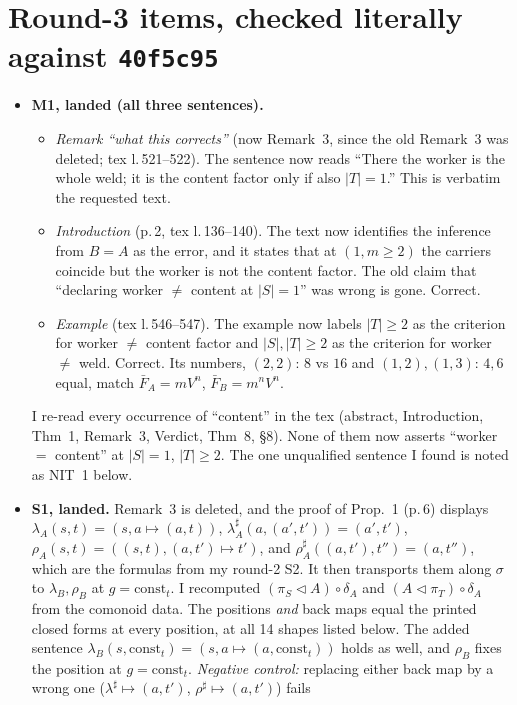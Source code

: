 \documentclass[10pt]{article}
\newcommand{\cst}{\mathrm{const}}
\begin{document}
\section*{Round-3 items, checked literally against \texttt{40f5c95}}
\begin{itemize}[leftmargin=*]
\item \textbf{M1, landed (all three sentences).}
  \begin{itemize}[leftmargin=*]
  \item \emph{Remark ``what this corrects''} (now Remark~3, since the old Remark~3 was deleted; tex l.\,521--522). The sentence now reads ``There the
  worker is the whole weld; it is the content factor only if also $|T|=1$.'' This is verbatim the requested text.
  \item \emph{Introduction} (p.\,2, tex l.\,136--140). The text now identifies the inference from $B=A$ as the error, and it states that at $(1,m\ge2)$ the carriers
  coincide but the worker is not the content factor. The old claim that ``declaring worker $\ne$ content at $|S|=1$'' was wrong is gone. Correct.
  \item \emph{Example} (tex l.\,546--547). The example now labels $|T|\ge2$ as the criterion for worker $\ne$ content factor and $|S|,|T|\ge2$ as the criterion for worker
  $\ne$ weld. Correct. Its numbers, $(2,2)$: $8$ vs $16$ and $(1,2),(1,3)$: $4,6$ equal, match $\bar F_A=mV^n$, $\bar F_B=m^nV^n$.
  \end{itemize}
  I re-read every occurrence of ``content'' in the tex (abstract, Introduction, Thm~1, Remark~3, Verdict, Thm~8, \S8). None of them now asserts
  ``worker $=$ content'' at $|S|=1$, $|T|\ge2$. The one unqualified sentence I found is noted as NIT~1 below.
\item \textbf{S1, landed.} Remark~3 is deleted, and the proof of Prop.~1 (p.\,6) displays
  $\lambda_A(s,t)=(s,a\mapsto(a,t))$, $\lambda_A^\sharp(a,(a',t'))=(a',t')$, $\rho_A(s,t)=((s,t),(a,t')\mapsto t')$, and
  $\rho_A^\sharp((a,t'),t'')=(a,t'')$, which are the formulas from my round-2 S2. It then transports them along $\sigma$ to $\lambda_B,\rho_B$ at $g=\cst_t$.
  I recomputed $(\pi_S\triangleleft A)\circ\delta_A$ and $(A\triangleleft\pi_T)\circ\delta_A$ from the comonoid data. The positions \emph{and} back maps
  equal the printed closed forms at every position, at all 14 shapes listed below. The added sentence
  $\lambda_B(s,\cst_t)=(s,a\mapsto(a,\cst_t))$ holds as well, and $\rho_B$ fixes the position at $g=\cst_t$.
  \emph{Negative control:} replacing either back map by a wrong one ($\lambda^\sharp\mapsto(a,t')$, $\rho^\sharp\mapsto(a,t')$) fails

\end{itemize}
\end{document}
